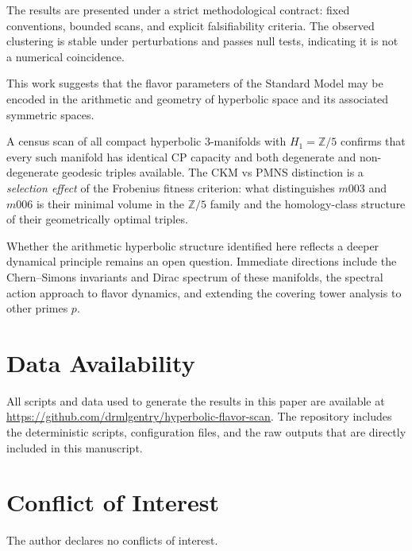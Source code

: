 \documentclass[12pt]{article}
\theoremstyle{definition}
\begin{document}
The results are presented under a strict methodological contract: fixed conventions, bounded scans, and explicit falsifiability criteria. The observed clustering is stable under perturbations and passes null tests, indicating it is not a numerical coincidence.

This work suggests that the flavor parameters of the Standard Model may be encoded in the arithmetic and geometry of hyperbolic space and its associated symmetric spaces.

A census scan of all compact hyperbolic 3-manifolds with $H_1=\mathbb{Z}/5$ confirms that every such manifold has identical CP capacity and both degenerate and non-degenerate geodesic triples available. The CKM vs PMNS distinction is a \emph{selection effect} of the Frobenius fitness criterion: what distinguishes $m003$ and $m006$ is their minimal volume in the $\mathbb{Z}/5$ family and the homology-class structure of their geometrically optimal triples.

Whether the arithmetic hyperbolic structure identified here reflects a deeper dynamical principle remains an open question. Immediate directions include the Chern--Simons invariants and Dirac spectrum of these manifolds, the spectral action approach to flavor dynamics, and extending the covering tower analysis to other primes $p$.

\section*{Data Availability}
All scripts and data used to generate the results in this paper are available at \url{https://github.com/drmlgentry/hyperbolic-flavor-scan}. The repository includes the deterministic scripts, configuration files, and the raw outputs that are directly included in this manuscript.

\section*{Conflict of Interest}
The author declares no conflicts of interest.
\end{document}
